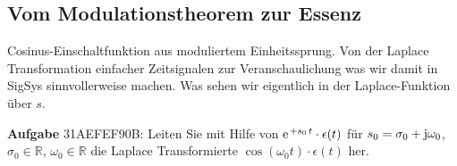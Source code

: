\documentclass[11pt,a4paper,DIV=12]{scrartcl}
\numberwithin{equation}{section}
\numberwithin{figure}{section}
\begin{document}




\clearpage
\subsection{Vom Modulationstheorem zur Essenz}
\label{sec:31AEFEF90B}
\begin{Ziel}
Cosinus-Einschaltfunktion aus moduliertem Einheitssprung. Von der
Laplace Transformation einfacher Zeitsignalen zur Veranschaulichung was wir damit
in SigSys sinnvollerweise machen. Was sehen wir eigentlich in der Laplace-Funktion
über $s$.
\end{Ziel}
\textbf{Aufgabe} {\tiny 31AEFEF90B}: Leiten Sie mit Hilfe von
$\e^{+s_0 \, t} \cdot \epsilon(t)$ für
$s_0=\sigma_0 + \im \omega_0$,
$\sigma_0\in\mathbb{R}$,
$\omega_0\in\mathbb{R}$
die Laplace Transformierte
$\cos(\omega_0 t) \cdot \epsilon(t)$ her.
\end{document}
